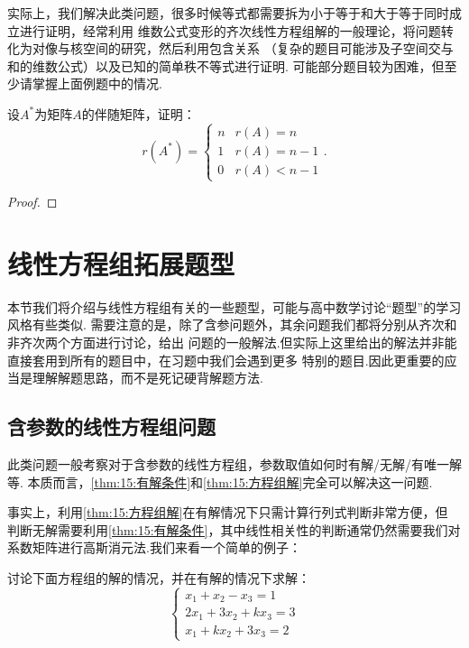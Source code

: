 实际上，我们解决此类问题，很多时候等式都需要拆为小于等于和大于等于同时成立进行证明，经常利用
维数公式变形的齐次线性方程组解的一般理论，将问题转化为对像与核空间的研究，然后利用包含关系
（复杂的题目可能涉及子空间交与和的维数公式）以及已知的简单秩不等式进行证明.
可能部分题目较为困难，但至少请掌握上面例题中的情况.
\begin{example}
    设$A^*$为矩阵$A$的伴随矩阵，证明：
    \[r(A^*)=\begin{cases}
        n & r(A)=n \\ 1 & r(A)=n-1 \\ 0 & r(A) < n-1
    \end{cases}.\]
\end{example}
\begin{proof}
    
\end{proof}

\section{线性方程组拓展题型}
本节我们将介绍与线性方程组有关的一些题型，可能与高中数学讨论``题型''的学习风格有些类似.
需要注意的是，除了含参问题外，其余问题我们都将分别从齐次和非齐次两个方面进行讨论，给出
问题的一般解法.但实际上这里给出的解法并非能直接套用到所有的题目中，在习题中我们会遇到更多
特别的题目.因此更重要的应当是理解解题思路，而不是死记硬背解题方法.

\subsection{含参数的线性方程组问题}
此类问题一般考察对于含参数的线性方程组，参数取值如何时有解/无解/有唯一解等.
本质而言，\autoref{thm:15:有解条件}和\autoref{thm:15:方程组解}完全可以解决这一问题.

事实上，利用\autoref{thm:15:方程组解}在有解情况下只需计算行列式判断非常方便，但
判断无解需要利用\autoref{thm:15:有解条件}，其中线性相关性的判断通常仍然需要我们对
系数矩阵进行高斯消元法.我们来看一个简单的例子：
\begin{example}
    讨论下面方程组的解的情况，并在有解的情况下求解：\[\begin{cases}
        x_1+x_2-x_3=1 \\ 2x_1+3x_2+kx_3=3 \\ x_1+kx_2+3x_3=2
    \end{cases}\]
\end{example}
\begin{solution}

\end{solution}

